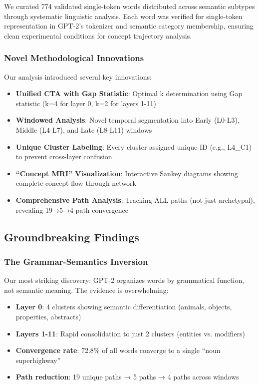 We curated 774 validated single-token words distributed across semantic subtypes through systematic linguistic analysis. Each word was verified for single-token representation in GPT-2's tokenizer and semantic category membership, ensuring clean experimental conditions for concept trajectory analysis.

\subsubsection{Novel Methodological Innovations}

Our analysis introduced several key innovations:

\begin{itemize}
    \item \textbf{Unified CTA with Gap Statistic}: Optimal k determination using Gap statistic (k=4 for layer 0, k=2 for layers 1-11)
    \item \textbf{Windowed Analysis}: Novel temporal segmentation into Early (L0-L3), Middle (L4-L7), and Late (L8-L11) windows
    \item \textbf{Unique Cluster Labeling}: Every cluster assigned unique ID (e.g., L4\_C1) to prevent cross-layer confusion
    \item \textbf{``Concept MRI'' Visualization}: Interactive Sankey diagrams showing complete concept flow through network
    \item \textbf{Comprehensive Path Analysis}: Tracking ALL paths (not just archetypal), revealing 19→5→4 path convergence
\end{itemize}

\subsection{Groundbreaking Findings}

\subsubsection{The Grammar-Semantics Inversion}

Our most striking discovery: GPT-2 organizes words by grammatical function, not semantic meaning. The evidence is overwhelming:

\begin{itemize}
    \item \textbf{Layer 0}: 4 clusters showing semantic differentiation (animals, objects, properties, abstracts)
    \item \textbf{Layers 1-11}: Rapid consolidation to just 2 clusters (entities vs. modifiers)
    \item \textbf{Convergence rate}: 72.8\% of all words converge to a single ``noun superhighway''
    \item \textbf{Path reduction}: 19 unique paths → 5 paths → 4 paths across windows
\end{itemize}

